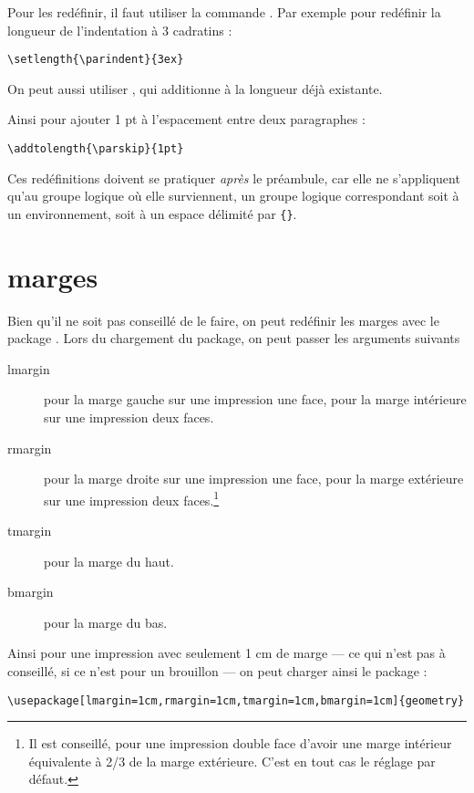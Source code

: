 Pour les redéfinir, il faut utiliser la commande . Par exemple pour redéfinir la longueur de l'indentation à 3 cadratins :
\begin{verbatim}
\setlength{\parindent}{3ex}
\end{verbatim}

On peut aussi utiliser , qui additionne  à la longueur déjà existante.

Ainsi pour ajouter 1 pt à l'espacement entre deux paragraphes :

\begin{verbatim}
\addtolength{\parskip}{1pt}
\end{verbatim}

Ces redéfinitions doivent se pratiquer \emph{après} le préambule, car elle ne s'appliquent qu'au groupe logique où elle surviennent, un groupe logique correspondant soit à un environnement, soit à un espace délimité par \verb|{}|.

\section{marges}

Bien qu'il ne soit pas conseillé de le faire, on peut redéfinir les marges avec le package . Lors du chargement du package, on peut passer les arguments suivants
\begin{description}
\item[lmargin]pour la marge gauche sur une impression une face, pour la marge intérieure sur une impression deux faces.
\item[rmargin]pour la marge droite sur une impression une face, pour la marge extérieure sur une impression deux faces.\footnote{Il est conseillé, pour une impression double face d'avoir une marge intérieur équivalente à 2/3 de la marge extérieure. C'est en tout cas le réglage par défaut.}
\item[tmargin]pour la marge du haut.
\item[bmargin]pour la marge du bas.
\end{description}

Ainsi pour une impression avec seulement 1 cm de marge --- ce qui n'est pas à conseillé, si ce n'est pour un brouillon --- on peut charger ainsi le package :

\begin{verbatim}
\usepackage[lmargin=1cm,rmargin=1cm,tmargin=1cm,bmargin=1cm]{geometry}
\end{verbatim}

